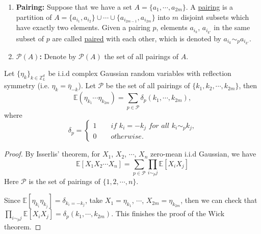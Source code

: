 \begin{defn}
\begin{enumerate}
    \item \textbf{Pairing:} Suppose that we have a set $A=\{a_1,\cdots,a_{2m}\}$. A \underline{pairing} is a partition of $A=\{a_{i_1},a_{i_2}\}\cup\cdots\cup \{a_{i_{2m-1}},a_{i_{2m}}\}$ into $m$ disjoint subsets which have exactly two elements. Given a pairing $p$, elements $a_{i_{k}}$, $a_{i_{k'}}$ in the same subset of $p$ are called \underline{paired} with each other, which is denoted by $a_{i_{k}}\sim_{p} a_{i_{k'}}$.
    \item \textbf{$\mathcal{P}(A)$:} Denote by $\mathcal{P}(A)$ the set of all pairings of $A$.
\end{enumerate}




\end{defn}

\begin{lem}\label{th.wick}
Let $\{\eta_k\}_{k\in\mathbb{Z}^d_L}$ be i.i.d complex Gaussian random variables with reflection symmetry (i.e. $\eta_{k}=\bar{\eta}_{-k}$). Let $\mathcal{P}$ be the set of all pairings of $\{k_1,k_2,\cdots,k_{2m}\}$, then
\begin{equation}
    \mathbb{E}(\eta_{k_1}\cdots \eta_{k_{2m}})=\sum_{p\in \mathcal{P}}  \delta_{p}(k_1,\cdots,k_{2m}), 
\end{equation}
where 
\begin{equation}\label{eq.deltapairing}
\delta_{p}=\begin{cases}
1\qquad \textit{if $k_{i}=-k_{j}$ for all $k_{i}\sim_{p}k_{j}$,}
\\
0\qquad \textit{otherwise.}
\end{cases}
\end{equation}
\end{lem}
\begin{proof}
By Isserlis' theorem, for $X_1$, $X_2$, $\cdots$, $X_n$ zero-mean i.i.d Gaussian, we have 
\begin{equation}
    \mathbb{E} [X_1 X_2 \cdots X_n] = \sum_{p\in\mathcal{P}} \prod_{i\sim_{p}j} \mathbb{E} [X_i X_j]
\end{equation}
Here $\mathcal{P}$ is the set of pairings of $\{1,2,\cdots,n\}$.

Since $\mathbb{E} [\eta_{k_i}\eta_{k_j}]=\delta_{k_i=-k_j}$, take $X_1=\eta_{k_1}$, $\cdots$, $X_{2m}=\eta_{k_{2m}}$, then we can check that $\prod_{i\sim_{p}j} \mathbb{E} [X_i X_j]=\delta_{p}(k_1,\cdots,k_{2m})$. This finishes the proof of the Wick theorem.
\end{proof}


